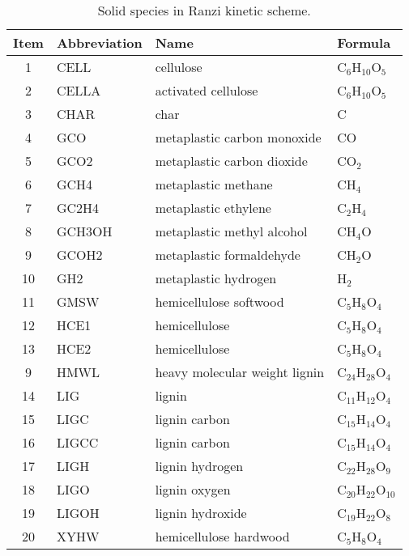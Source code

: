 \begin{table}[H]
    \centering
    \caption{Solid species in Ranzi kinetic scheme.}
    \begin{tabular}{@{}clll@{}}
        \toprule
        Item & Abbreviation & Name & Formula \\
        \midrule
        1   & CELL      & cellulose                     & C$_6$H$_{10}$O$_5$ \\
        2   & CELLA     & activated cellulose           & C$_6$H$_{10}$O$_5$ \\
        3   & CHAR      & char                          & C \\
        4   & GCO       & metaplastic carbon monoxide   & CO \\
        5   & GCO2      & metaplastic carbon dioxide    & CO$_2$ \\
        6   & GCH4      & metaplastic methane           & CH$_4$ \\
        7   & GC2H4     & metaplastic ethylene          & C$_2$H$_4$ \\
        8   & GCH3OH    & metaplastic methyl alcohol    & CH$_4$O \\
        9   & GCOH2     & metaplastic formaldehyde      & CH$_2$O \\
        10  & GH2       & metaplastic hydrogen          & H$_2$ \\
        11  & GMSW      & hemicellulose softwood        & C$_5$H$_8$O$_4$ \\
        12  & HCE1      & hemicellulose                 & C$_5$H$_8$O$_4$ \\
        13  & HCE2      & hemicellulose                 & C$_5$H$_8$O$_4$ \\
        9   & HMWL      & heavy molecular weight lignin & C$_{24}$H$_{28}$O$_4$ \\
        14  & LIG       & lignin                        & C$_{11}$H$_{12}$O$_4$ \\
        15  & LIGC      & lignin carbon                 & C$_{15}$H$_{14}$O$_4$ \\
        16  & LIGCC     & lignin carbon                 & C$_{15}$H$_{14}$O$_4$ \\
        17  & LIGH      & lignin hydrogen               & C$_{22}$H$_{28}$O$_9$ \\
        18  & LIGO      & lignin oxygen                 & C$_{20}$H$_{22}$O$_{10}$ \\
        19  & LIGOH     & lignin hydroxide              & C$_{19}$H$_{22}$O$_8$ \\
        20  & XYHW      & hemicellulose hardwood        & C$_5$H$_8$O$_4$ \\
        \bottomrule
    \end{tabular}
\end{table}

